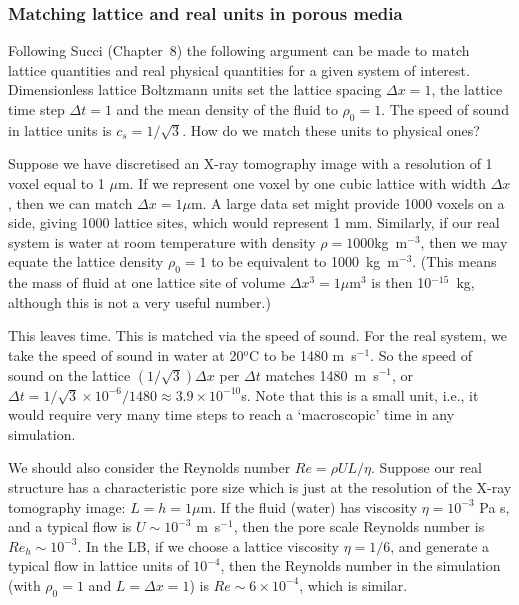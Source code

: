 \subsubsection{Matching lattice and real units in porous media}


Following Succi \cite{succi} (Chapter~8) the following argument
can be made to match lattice quantities and real physical
quantities for a given system of interest.
Dimensionless lattice Boltzmann units set the lattice spacing
$\Delta x = 1$, the lattice time step $\Delta t = 1$ and the
mean density of the fluid to $\rho_0 = 1$. The speed of sound
in lattice units is $c_s = 1/ \sqrt{3}$. How do we match these
units to physical ones?

Suppose we have discretised an X-ray tomography image with a resolution
of 1 voxel equal to 1 $\mu$m. If we represent one voxel by one cubic
lattice with width $\Delta x$, then we can match $\Delta x = 1\mu$m. A
large data set might provide 1000 voxels on a side, giving
1000 lattice sites, which would represent 1 mm.
Similarly, if our real system is water at room temperature with density
$\rho = 1000$kg~m$^{-3}$, then we may equate the lattice density
$\rho_0 = 1$ to be equivalent to 1000~kg~m$^{-3}$. (This means the
mass of fluid at one lattice site of volume $\Delta x^3 = 1 \mu$m$^{3}$
is then 10$^{-15}$~kg, although this is not a very useful number.)

This leaves time. This is matched via the speed of sound. For the real
system, we take the speed of sound in water at 20$^o$C to be
1480 m~s$^{-1}$. So the speed of sound on the lattice
$(1/\sqrt{3}) \Delta x$ per $\Delta t$ matches 1480~m~s$^{-1}$,
or $\Delta t = 1/\sqrt{3} \times 10^{-6} / 1480 \approx 3.9 \times 10^{-10}$s.
Note that this is a small unit, i.e., it would require very many time
steps to reach a `macroscopic' time in any simulation.

We should also consider the Reynolds number $Re = \rho U L / \eta$.
Suppose our real structure has a characteristic pore size which is
just at the resolution of the X-ray tomography image: $L = h = 1\mu$m.
If the fluid (water) has viscosity $\eta = 10^{-3}$ Pa s, and
a typical flow is $U \sim 10^{-3}$ m~s$^{-1}$, then the pore scale
Reynolds number is $Re_h \sim 10^{-3}$. In the LB, if we choose a
lattice viscosity $\eta = 1/6$, and generate a typical flow in
lattice units of $10^{-4}$, then the Reynolds number in the
simulation (with $\rho_0 = 1$ and $L = \Delta x = 1$) is
$Re \sim 6 \times 10^{-4}$, which is similar.


